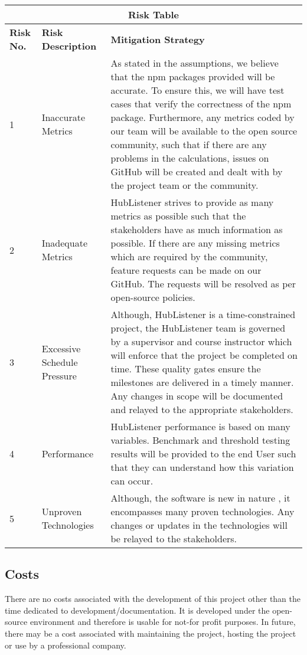 \documentclass{article}
\begin{document}
\begin{tabular}{ |p{1cm}|p{5cm}|p{8cm}| }
\hline
\multicolumn{3}{|c|}{\textbf{Risk Table}} \\
\hline
\textbf{Risk No.} & \textbf{Risk Description} & \textbf{Mitigation Strategy} \\
\hline 
1 & Inaccurate Metrics & As stated in the assumptions, we believe that the npm packages provided will be accurate. To ensure this, we will have test cases that verify the correctness of the npm package. Furthermore, any metrics coded by our team will be available to the open source community, such that if there are any problems in the calculations, issues on GitHub will be created and dealt with by the project team or the community. \\
\hline 
2 & Inadequate Metrics & HubListener strives to provide as many metrics as possible such that the stakeholders have as much information as possible. If there are any missing metrics which are required by the community, feature requests can be made on our GitHub. The requests will be resolved as per open-source policies. \\
\hline 
3 & Excessive Schedule Pressure & Although, HubListener is a time-constrained project, the HubListener team is governed by a supervisor and course instructor which will enforce that the project be completed on time. These quality gates ensure the milestones are delivered in a timely manner. Any changes in scope will be documented and relayed to the appropriate stakeholders. \\ 
\hline 
4 & Performance  & HubListener performance is based on many variables. Benchmark and threshold testing results will be provided to the end User such that they can understand how this variation can occur. \\
\hline 
5 & Unproven Technologies & Although, the software is new in nature , it encompasses many proven technologies. Any changes or updates in the technologies will be relayed to the stakeholders. \\
\hline
\end{tabular}


\subsection{Costs}

There are no costs associated with the development of this project other than the time dedicated to development/documentation. It is developed under the open-source environment and therefore is usable for not-for profit purposes. In future, there may be a cost associated with maintaining the project, hosting the project or use by a professional company. 
\end{document}
